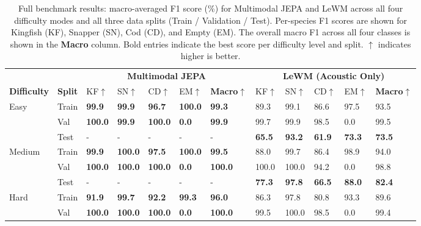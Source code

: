 \begin{table}[t]
\centering
\caption{%
  Full benchmark results: macro-averaged F1 score (\%) for Multimodal JEPA and LeWM across all four
  difficulty modes and all three data splits (Train / Validation / Test).
  Per-species F1 scores are shown for Kingfish (KF), Snapper (SN), Cod (CD), and Empty (EM).
  The overall macro F1 across all four classes is shown in the \textbf{Macro} column.
  Bold entries indicate the best score per difficulty level and split.
  $\uparrow$ indicates higher is better.
}
\label{tab:full_results}
\setlength{\tabcolsep}{4.5pt}
\small
\begin{tabular}{@{}ll lllll lllll@{}}
\toprule
& & \multicolumn{5}{c}{\textbf{Multimodal JEPA} \cite{assran2023self}} 
  & \multicolumn{5}{c}{\textbf{LeWM (Acoustic Only)} \cite{lecun2026le}} \\
\cmidrule(lr){3-7} \cmidrule(lr){8-12}
\textbf{Difficulty} & \textbf{Split} 
  & KF$\uparrow$ & SN$\uparrow$ & CD$\uparrow$ & EM$\uparrow$ & \textbf{Macro}$\uparrow$
  & KF$\uparrow$ & SN$\uparrow$ & CD$\uparrow$ & EM$\uparrow$ & \textbf{Macro}$\uparrow$ \\
\midrule
\multirow{3}{*}{Easy}
  & Train & \textbf{99.9} & \textbf{99.9} & \textbf{96.7} & \textbf{100.0} & \textbf{99.3} & 89.3 & 99.1 & 86.6 & 97.5 & 93.5 \\
  & Val & \textbf{100.0} & \textbf{99.9} & \textbf{100.0} & \textbf{0.0} & \textbf{99.9} & 99.7 & 99.9 & 98.5 & 0.0 & 99.5 \\
  & Test & - & - & - & - & - & \textbf{65.5} & \textbf{93.2} & \textbf{61.9} & \textbf{73.3} & \textbf{73.5} \\
\midrule
\multirow{3}{*}{Medium}
  & Train & \textbf{99.9} & \textbf{100.0} & \textbf{97.5} & \textbf{100.0} & \textbf{99.5} & 88.0 & 99.7 & 86.4 & 98.9 & 94.0 \\
  & Val & \textbf{100.0} & \textbf{100.0} & \textbf{100.0} & \textbf{0.0} & \textbf{100.0} & 100.0 & 100.0 & 94.2 & 0.0 & 98.8 \\
  & Test & - & - & - & - & - & \textbf{77.3} & \textbf{97.8} & \textbf{66.5} & \textbf{88.0} & \textbf{82.4} \\
\midrule
\multirow{3}{*}{Hard}
  & Train & \textbf{91.9} & \textbf{99.7} & \textbf{92.2} & \textbf{99.3} & \textbf{96.0} & 86.3 & 97.8 & 80.8 & 93.3 & 89.6 \\
  & Val & \textbf{100.0} & \textbf{100.0} & \textbf{100.0} & \textbf{0.0} & \textbf{100.0} & 99.5 & 100.0 & 98.5 & 0.0 & 99.4 \\

\end{tabular}
\end{table}
